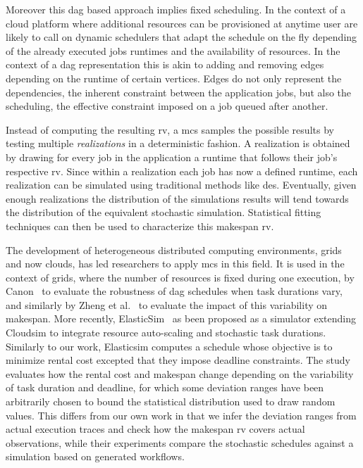 \documentclass[10pt,conference,compsocconf]{IEEEtran}
\begin{document}
Moreover this \ac{dag} based approach implies fixed scheduling. In the context
of a cloud platform where additional resources can be provisioned at anytime
user are likely to call on dynamic schedulers that adapt the schedule on the fly
depending of the already executed jobs runtimes and the availability of
resources. In the context of a \ac{dag} representation this is akin to adding
and removing edges depending on the runtime of certain vertices. Edges do not
only represent the dependencies, the inherent constraint between the application
jobs, but also the scheduling, the effective constraint imposed on a job queued
after another.


Instead  of computing  the resulting  \ac{rv}, a  \ac{mcs} samples  the possible
results by testing  multiple \emph{realizations} in a  deterministic fashion.  A
realization is  obtained by drawing for  every job in the  application a runtime
that follows their job's respective \ac{rv}. Since within a realization each job
has now a  defined runtime, each realization can be  simulated using traditional
methods like \ac{des}.  Eventually, given enough realizations the distribution of
the simulations  results will  tend towards the  distribution of  the equivalent
stochastic  simulation.  Statistical  fitting  techniques can  then  be used  to
characterize this makespan \ac{rv}.

The development  of heterogeneous distributed computing  environments, grids and
now clouds, has led researchers to apply  \ac{mcs} in this field.  It is used in
the  context  of grids,  where  the  number of  resources  is  fixed during  one
execution,  by  Canon~\cite{Canon10}  to  evaluate the  robustness  of  \ac{dag}
schedules when task durations vary, and similarly by Zheng et al.~\cite{Zheng13}
to  evaluate  the  impact  of  this variability  on  makespan.   More  recently,
ElasticSim~\cite{Cai17} as  been proposed as  a simulator extending  Cloudsim to
integrate resource auto-scaling and stochastic  task durations. Similarly to our
work, Elasticsim computes a schedule whose  objective is to minimize rental cost
excepted  that they  impose deadline  constraints. The  study evaluates  how the
rental cost  and makespan change depending  on the variability of  task duration
and deadline,  for which some deviation  ranges have been arbitrarily  chosen to
bound the statistical distribution used to draw random values. This differs from
our own work in that we infer  the deviation ranges from actual execution traces
and  check how  the makespan  \ac{rv}  covers actual  observations, while  their
experiments  compare the  stochastic  schedules against  a  simulation based  on
generated workflows.
\end{document}
